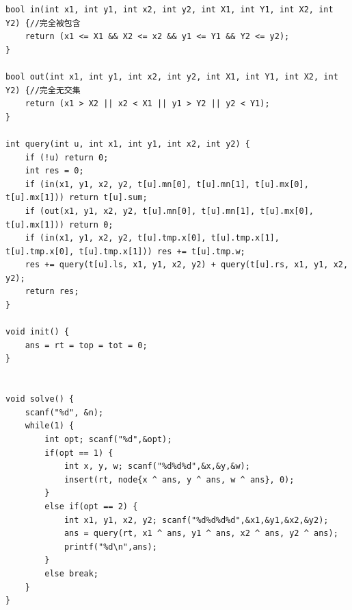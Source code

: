 \documentclass[twoside]{article}
\begin{document}
\begin{lstlisting}
bool in(int x1, int y1, int x2, int y2, int X1, int Y1, int X2, int Y2) {//完全被包含
    return (x1 <= X1 && X2 <= x2 && y1 <= Y1 && Y2 <= y2);
}

bool out(int x1, int y1, int x2, int y2, int X1, int Y1, int X2, int Y2) {//完全无交集
    return (x1 > X2 || x2 < X1 || y1 > Y2 || y2 < Y1);
}

int query(int u, int x1, int y1, int x2, int y2) {
    if (!u) return 0;
    int res = 0;
    if (in(x1, y1, x2, y2, t[u].mn[0], t[u].mn[1], t[u].mx[0], t[u].mx[1])) return t[u].sum;
    if (out(x1, y1, x2, y2, t[u].mn[0], t[u].mn[1], t[u].mx[0], t[u].mx[1])) return 0;
    if (in(x1, y1, x2, y2, t[u].tmp.x[0], t[u].tmp.x[1], t[u].tmp.x[0], t[u].tmp.x[1])) res += t[u].tmp.w;
    res += query(t[u].ls, x1, y1, x2, y2) + query(t[u].rs, x1, y1, x2, y2);
    return res;
}

void init() {
    ans = rt = top = tot = 0;
}


void solve() {
    scanf("%d", &n);
    while(1) {
        int opt; scanf("%d",&opt);
        if(opt == 1) {
            int x, y, w; scanf("%d%d%d",&x,&y,&w);
            insert(rt, node{x ^ ans, y ^ ans, w ^ ans}, 0);
        }
        else if(opt == 2) {
            int x1, y1, x2, y2; scanf("%d%d%d%d",&x1,&y1,&x2,&y2);
            ans = query(rt, x1 ^ ans, y1 ^ ans, x2 ^ ans, y2 ^ ans);
            printf("%d\n",ans);
        }
        else break;
    }
}\end{lstlisting}
\end{document}
